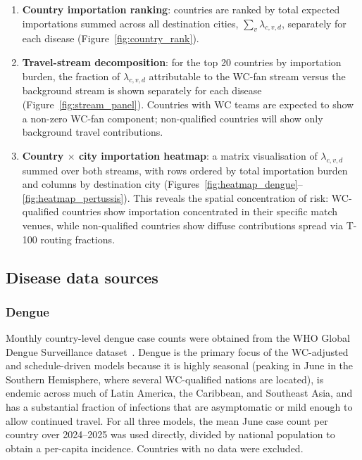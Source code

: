 \documentclass[12pt]{article}
\begin{document}
\begin{enumerate}
  \item \textbf{Country importation ranking}: countries are ranked by
    total expected importations summed across all destination cities,
    $\sum_v \lambda_{c,v,d}$, separately for each disease
    (Figure~\ref{fig:country_rank}).

  \item \textbf{Travel-stream decomposition}: for the top 20
    countries by importation burden, the fraction of
    $\lambda_{c,v,d}$ attributable to the WC-fan stream
    versus the background stream is shown separately for each disease
    (Figure~\ref{fig:stream_panel}).
    Countries with WC teams are expected to show a non-zero WC-fan
    component; non-qualified countries will show only background travel
    contributions.

  \item \textbf{Country $\times$ city importation heatmap}: a matrix
    visualisation of $\lambda_{c,v,d}$ summed over both streams,
    with rows ordered by total importation burden and columns by
    destination city (Figures~\ref{fig:heatmap_dengue}--\ref{fig:heatmap_pertussis}).
    This reveals the spatial concentration of risk: WC-qualified
    countries show importation concentrated in their specific match
    venues, while non-qualified countries show diffuse contributions
    spread via T-100 routing fractions.
\end{enumerate}

\subsection*{Disease data sources}

\subsubsection*{Dengue}

Monthly country-level dengue case counts were obtained from the WHO
Global Dengue Surveillance dataset~\cite{WHO_dengue}. Dengue
is the primary focus of the WC-adjusted and schedule-driven models
because it is highly seasonal (peaking in June in the Southern
Hemisphere, where several WC-qualified nations are located), is
endemic across much of Latin America, the Caribbean, and Southeast
Asia, and has a substantial fraction of infections that are
asymptomatic or mild enough to allow continued travel. For all three models, the mean June case count per country over
2024--2025 was used directly, divided by national population to
obtain a per-capita incidence. Countries with no data were excluded.
\end{document}
